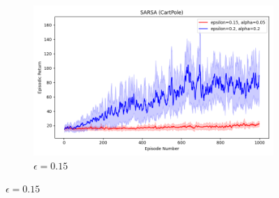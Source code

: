 \documentclass[11pt, a4]{article}
\begin{document}
\begin{figure}[h]
\begin{subfigure}[h]{0.3\textwidth}
					\centering
					\includegraphics[width=\textwidth]{../cartpole-v1/plots/sarsa_0.05_0.15vs0.2_0.2.png}
					\caption{$\epsilon = 0.15$}
				\end{subfigure}
				
				\vspace{0.1cm} %
				

\end{figure}
\end{document}
